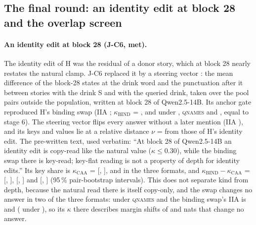 \subsection{The final round: an identity edit at block 28 and the overlap screen}\label{app:binding-j}

\paragraph{An identity edit at block 28 (J-C6, met).} The identity edit of H was the residual of a donor story, which at block 28 nearly restates the natural clamp. J-C6 replaced it by a steering vector \citep{panickssery2023caa}: the mean difference of the block-28 states at the drink word and the punctuation after it between stories with the drink S and with the queried drink, taken over the pool pairs outside the population, written at block 28 of Qwen2.5-14B. Its anchor gate reproduced H's binding swap (IIA \JcGsevenIIA{}; $\kappa_{\mathrm{BIND}}$ = \JcGsevenKappaNoMention{}, \JcGsevenKappaQnames{} and \JcGsevenKappaOptAfter{} under \fmtNone{}, \textsc{qnames} and \fmtOpt{}, equal to stage 6). The steering vector flips every answer without a later mention (IIA \JcSixFlip{}), and its keys and values lie at a relative distance $\nu$ = \JcSixNuNoMention{} from those of H's identity edit. The pre-written text, used verbatim: ``At block 28 of Qwen2.5-14B an identity edit is copy-read like the natural value ($\kappa \leq 0.30$), while the binding swap there is key-read; key-flat reading is not a property of depth for identity edits.'' Its key share is $\kappa_{\mathrm{CAA}}$ = \JcSixKappaCaaNoMention{} [\JcSixKappaCaaNoMentionLo{}, \JcSixKappaCaaNoMentionHi{}], \JcSixKappaCaaQnames{} and \JcSixKappaCaaOptAfter{} in the three formats, and $\kappa_{\mathrm{BIND}} - \kappa_{\mathrm{CAA}}$ = \JcSixDiffNoMention{} [\JcSixDiffNoMentionLo{}, \JcSixDiffNoMentionHi{}], \JcSixDiffQnames{} [\JcSixDiffQnamesLo{}, \JcSixDiffQnamesHi{}] and \JcSixDiffOptAfter{} [\JcSixDiffOptAfterLo{}, \JcSixDiffOptAfterHi{}] (95\,\% pair-bootstrap intervals). This does not separate kind from depth, because the natural read there is itself copy-only, and the swap changes no answer in two of the three formats: under \textsc{qnames} and \fmtOpt{} the binding swap's IIA is \JcSixIIABindQnames{} and \JcSixIIABindOptAfter{} (\JcSixIIABindNoMention{} under \fmtNone{}), so its $\kappa$ there describes margin shifts of \JcSixPhiBindQnames{} and \JcSixPhiBindOptAfter{} nats that change no answer. %

